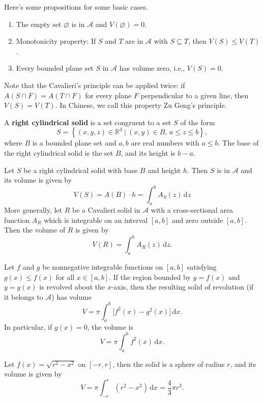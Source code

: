 	\begin{corollaryenv}
		Here's some propositions for some basic cases.
		\begin{enumerate}
			\item The empty set $\varnothing$ is in $\mathcal{A}$ and $V(\varnothing)=0$.
			\item Monotonicity property: If $S$ and $T$ are in $\mathcal{A}$ with $S\subseteq T$, then $V(S)\le V(T)$.
			\item Every bounded plane set $S$ in $\mathcal{A}$ has volume zero, i.e., $V(S)=0$.
		\end{enumerate}
	\end{corollaryenv}
	\begin{remarkenv}
		Note that the Cavalieri's principle can be applied twice: if $A(S\cap F)=A(T\cap F)$ for every plane $F$ perpendicular to a given line, then $V(S)=V(T)$. In Chinese, we call this property Zu Geng's principle.
	\end{remarkenv}
	\begin{definitionenv}
		A \textbf{right cylindrical solid} is a set congruent to a set $S$ of the form
		\[
		S=\left\{(x,y,z)\in \mathbb{R}^3\ |\ (x,y)\in B,\, a\le z \le b \right\},
		\]
		where $B$ is a bounded plane set and $a,b$ are real numbers with $a\le b$. The base of the right cylindrical solid is the set $B$, and its height is $b-a$.
	\end{definitionenv}
	\begin{theoremenv}
		Let $S$ be a right cylindrical solid with base $B$ and height $h$. Then $S$ is in $\mathcal{A}$ and its volume is given by
		\[
		V(S)=A(B)\cdot h=\int_a^b A_S(z)\,\mathrm{d}z
		\]
		More generally, let $R$ be a Cavalieri solid in $\mathcal{A}$ with a cross-sectional area function $A_R$ which is integrable on an interval $[a,b]$ and zero outside $[a,b]$. Then the volume of $R$ is given by
		\[
		V(R)=\int_a^b A_R(z)\,\mathrm{d}z.
		\]
	\end{theoremenv}
	
	\begin{theoremenv}
	Let $f$ and $g$ be nonnegative integrable functions on $[a,b]$ satisfying $g(x) \le f(x)$ for all $x \in [a,b]$. If the region bounded by $y = f(x)$ and $y = g(x)$ is revolved about the $x$-axis, then the resulting solid of revolution (if it belongs to $\mathcal{A}$) has volume
	\[
		V = \pi \int_a^b \bigl[f^2(x) - g^2(x)\bigr] \, \mathrm{d}x .
	\]
	In particular, if $g(x) = 0$, the volume is
	\[
		V = \pi \int_a^b f^2(x) \, \mathrm{d}x .
	\]
	\end{theoremenv}
	\begin{exampleenv}
		 Let $f(x) = \sqrt{r^2 - x^2}$ on $[-r,r]$, then the solid is a sphere of radius $r$, and its volume is given by
		\[
		V = \pi \int_{-r}^{r} (r^2 - x^2)\, \mathrm{d}x = \frac{4}{3}\pi r^3.
		\]
	\end{exampleenv}

